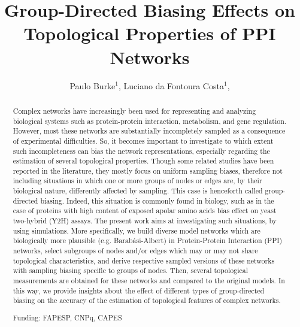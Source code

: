 \documentclass[twoside]{article}
\title{\vspace{-15mm}\fontsize{24pt}{10pt}\selectfont\textbf{ Group-Directed Biasing Effects on Topological Properties of PPI Networks }} %
\author{ Paulo Burke$^{1}$, Luciano da Fontoura Costa$^{1}$, }
\affil{ 1 IFSC - USP

 }
\date{}
\begin{document}
  
  
  \maketitle %
  
  
  \thispagestyle{fancy} %
  
  
  \begin{abstract}
  Complex networks have increasingly been used for representing and analyzing biological systems such as protein-protein interaction, metabolism, and gene regulation.  However, most these networks are substantially incompletely sampled as a consequence of experimental difficulties.  So, it becomes important to investigate to which extent such incompleteness can bias the network representations, especially regarding the estimation of several topological properties.  Though some related studies have been reported in the literature, they mostly focus on uniform sampling biases, therefore not including situations in which one or more groups of nodes or edges are, by their biological nature, differently affected by sampling.  This case is henceforth called group-directed biasing.  Indeed, this situation is commonly found in biology, such as in the case of proteins with high content of exposed apolar amino acids bias effect on yeast two-hybrid (Y2H) assays.  The present work aims at investigating such situations, by using simulations.  More specifically, we build diverse model networks which are biologically more plausible (e.g. Barab\'asi-Albert) in Protein-Protein Interaction (PPI) networks, select subgroups of nodes and/or edges which may or may not share topological characteristics, and derive respective sampled versions of these networks with sampling biasing specific to groups of nodes.  Then, several topological measurements are obtained for these networks and compared to the original models.  In this way, we provide insights about the effect of different types of group-directed biasing on the accuracy of the estimation of topological features of complex networks.
  
  Funding: FAPESP, CNPq, CAPES \\ 
  \end{abstract}
  
\end{document}
